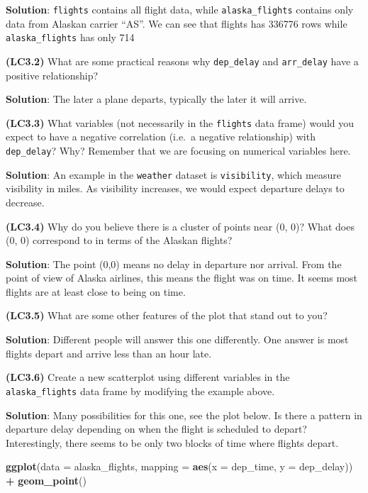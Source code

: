 \documentclass[12pt,]{krantz}
\makeatletter
\newenvironment{Shaded}{\begin{snugshade}}{\end{snugshade}}
\newcommand{\KeywordTok}[1]{\textcolor[rgb]{0.27,0.27,0.27}{\textbf{#1}}}
\newcommand{\DataTypeTok}[1]{\textcolor[rgb]{0.27,0.27,0.27}{#1}}
\newcommand{\StringTok}[1]{\textcolor[rgb]{0.5,0.5,0.5}{#1}}
\newcommand{\OperatorTok}[1]{\textcolor[rgb]{0.43,0.43,0.43}{\textbf{#1}}}
\newcommand{\NormalTok}[1]{#1}
\newenvironment{kframe}{%
\medskip{}
\setlength{\fboxsep}{.8em}
 \def\at@end@of@kframe{}%
 \ifinner\ifhmode%
  \def\at@end@of@kframe{\end{minipage}}%
  \begin{minipage}{\columnwidth}%
 \fi\fi%
 \def\FrameCommand##1{\hskip\@totalleftmargin \hskip-\fboxsep
 \colorbox{shadecolor}{##1}\hskip-\fboxsep
     \hskip-\linewidth \hskip-\@totalleftmargin \hskip\columnwidth}%
 \MakeFramed {\advance\hsize-\width
   \@totalleftmargin\z@ \linewidth\hsize
   \@setminipage}}%
 {\par\unskip\endMakeFramed%
 \at@end@of@kframe}
\renewenvironment{Shaded}{\begin{kframe}}{\end{kframe}}
\theoremstyle{definition}
\theoremstyle{definition}
\theoremstyle{definition}
\theoremstyle{remark}
\makeatother
\begin{document}
\textbf{Solution}: \texttt{flights} contains all flight data, while
\texttt{alaska\_flights} contains only data from Alaskan carrier ``AS''.
We can see that flights has 336776 rows while \texttt{alaska\_flights}
has only 714

\textbf{(LC3.2)} What are some practical reasons why \texttt{dep\_delay}
and \texttt{arr\_delay} have a positive relationship?

\textbf{Solution}: The later a plane departs, typically the later it
will arrive.

\textbf{(LC3.3)} What variables (not necessarily in the \texttt{flights}
data frame) would you expect to have a negative correlation (i.e.~a
negative relationship) with \texttt{dep\_delay}? Why? Remember that we
are focusing on numerical variables here.

\textbf{Solution}: An example in the \texttt{weather} dataset is
\texttt{visibility}, which measure visibility in miles. As visibility
increases, we would expect departure delays to decrease.

\textbf{(LC3.4)} Why do you believe there is a cluster of points near
(0, 0)? What does (0, 0) correspond to in terms of the Alaskan flights?

\textbf{Solution}: The point (0,0) means no delay in departure nor
arrival. From the point of view of Alaska airlines, this means the
flight was on time. It seems most flights are at least close to being on
time.

\textbf{(LC3.5)} What are some other features of the plot that stand out
to you?

\textbf{Solution}: Different people will answer this one differently.
One answer is most flights depart and arrive less than an hour late.

\textbf{(LC3.6)} Create a new scatterplot using different variables in
the \texttt{alaska\_flights} data frame by modifying the example above.

\textbf{Solution}: Many possibilities for this one, see the plot below.
Is there a pattern in departure delay depending on when the flight is
scheduled to depart? Interestingly, there seems to be only two blocks of
time where flights depart.

\begin{Shaded}
\begin{Highlighting}[]
\KeywordTok{ggplot}\NormalTok{(}\DataTypeTok{data =}\NormalTok{ alaska_flights, }\DataTypeTok{mapping =} \KeywordTok{aes}\NormalTok{(}\DataTypeTok{x =}\NormalTok{ dep_time, }\DataTypeTok{y =}\NormalTok{ dep_delay)) }\OperatorTok{+}
\StringTok{  }\KeywordTok{geom_point}\NormalTok{()}
\end{Highlighting}
\end{Shaded}
\end{document}
